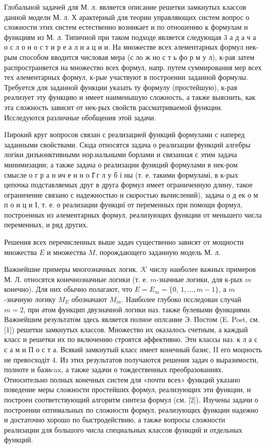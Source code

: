 \documentclass[10pt]{article}
\begin{document}
Глобальной задачей для М. л. является описание решетки замкнутых классов данной модели М. л. Х арактерный для теории управляющих систем вопрос о сложности этих систем естественно возникает и по отношению к формулам и функциям из М. л. Типичной при таком подходе является следующая 3 а д а ч а о с л о н о с т и р е а л и а ц и и. На множестве всех әлементарных формул нек-рым способом вводится числовая мера (с ло ж но с т ь фо р м у л), к-рая затем распространяется на множество всех формул, напр. путем суммирования мер всех тех әлементарных формул, к-рые участвуют в построении заданной формулы. Требуется для заданной функции указать ту формулу (простейшую), к-рая реализует эту функцию и имеет наименышую сложность, а также выяснить, как эта сложность зависит от нек-рых свойств рассматриваемой функции. Исследуются различные обобщения этой задачи.



IIирокий круг вопросов связан с реализацией функций формулами с наперед заданными свойствами. Сюда относятся задача о реализации функций алгебры логіки дизъюнктивными нор.иальными борлами и связанная с этим задача минимизации; а также задача о реализации функций формулами в нек-ром смысле о г р а н ич е н н о І̆ г л у б і ны (т. е. такими формуламі, в к-рых цепочка подставляемых друг в друга формул имеет ограниченную длину, такое ограничение связано с надежностью и скоростью вычислений), задача о д ек о м п о и ц и І, т. е. о реализации функциї от переменных при помощи формул, построенных из әлементарных формул, реализующих функции от меньшего числа переменных, и ряд других.



Решения всех перечисленных выше задач существенно зависят от мощности множества $E$ и множества $M$, порождающего заданную модель М. л.



Важнейшие примеры многозначных логик. $\mathcal{K}$ числу наиболее важных примеров М. Л. относятся конечнозначные логики (т. е. $m$-значные логики, для к-рых $m$ конечно). Для них обычно полагают, что $E=E_{m}=\{0$, $1, \ldots, m-1\}$, а $m$-значную логику $M_{E}$ обозначают $M_{i n}$. Наиболее глубоко псследован случай $m=2$, при әтом функцип двузначной логики наз. также булевыми функциями. Важнейшим результатом здесь является полное оплсание Э. Постом (E. Post, см. [1]) решетки замкнутых классов. Множество их оказалось счетным, а каждый класс и решетки их по включению строятся әффективно. Эти классы наз. к л а с с а м и П о с т а. Всякий замкнутый класс имеет конечный базис, II его моцность не превосходіт 4. Из этих результатов получаются решения задач о выразимости, полноте и базиcax, а также задачи о тождественных преобразованиях. Относительно полных конечных систем для «почти всех» функций указано поведение меры сложности простейших формул, реализующих эти функции, и построен соответствующий алгоритм синтеза формул (см. [2]). Изучены задачи о построении оптимальных по сложности формул, реализующих функции надежно и достаточно хорошо по быстродействию, а также вопросы сложности реализации для большого числа специальных классов функций и отдельных функций.
\end{document}
